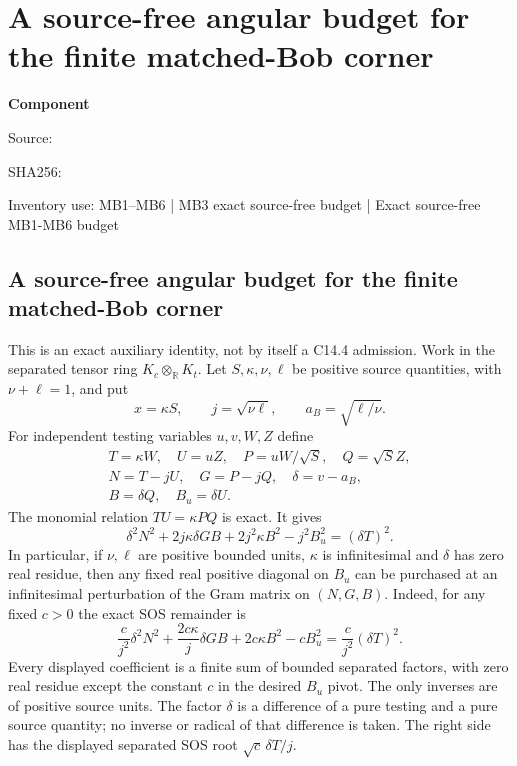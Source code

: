 \chapter{A source-free angular budget for the finite matched-Bob corner}
\label{component:pe55ec4890781}
\noindent\textbf{Component }\par
{\small\noindent Source: \par}
{\small\noindent SHA256: \par}
{\small\noindent Inventory use: MB1--MB6 | MB3 exact source-free budget | Exact source-free MB1-MB6 budget\par}
\medskip
\section{A source-free angular budget for the finite matched-Bob corner}
\label{pe55ec4890781:sec:new-c144-matched-budget}

This is an exact auxiliary identity, not by itself a C14.4 admission.
Work in the separated tensor ring $K_c\otimes_{\mathbb R}K_t$.
Let $S,\kappa,\nu,\ell$ be positive source quantities, with
$\nu+\ell=1$, and put
\[
 x=\kappa S,\qquad j=\sqrt{\nu\ell},\qquad
 a_B=\sqrt{\ell/\nu}.
 \tag{MB1}
\]
For independent testing variables $u,v,W,Z$ define
\[
\begin{gathered}
 T=\kappa W,\quad U=uZ,\quad P=uW/\sqrt S,\quad Q=\sqrt S Z,\\
 N=T-jU,\quad G=P-jQ,\quad \delta=v-a_B,\\
 B=\delta Q,\quad B_u=\delta U.
\end{gathered}
 \tag{MB2}
\]
The monomial relation $TU=\kappa PQ$ is exact. It gives
\[
 \delta^2N^2+2j\kappa\delta GB+2j^2\kappa B^2-j^2B_u^2
       =(\delta T)^2.
 \tag{MB3}
\]
In particular, if $\nu,\ell$ are positive bounded units,
$\kappa$ is infinitesimal and $\delta$ has zero real residue,
then any fixed real positive diagonal on $B_u$ can be purchased
at an infinitesimal perturbation of the Gram matrix on $(N,G,B)$.
Indeed, for any fixed $c>0$ the exact SOS remainder is
\[
 \frac{c}{j^2}\delta^2N^2+
       \frac{2c\kappa}{j}\delta GB+2c\kappa B^2-cB_u^2
       =\frac{c}{j^2}(\delta T)^2.
 \tag{MB4}
\]
Every displayed coefficient is a finite sum of bounded separated
factors, with zero real residue except the constant $c$ in the
desired $B_u$ pivot. The only inverses are of positive source units.
The factor $\delta$ is a difference of a pure testing and a pure
source quantity; no inverse or radical of that difference is taken.
The right side has the displayed separated SOS root
$\sqrt c\,\delta T/j$.

